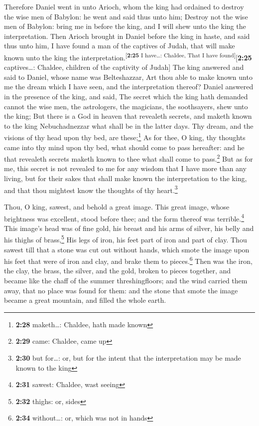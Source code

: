  Therefore Daniel went in unto Arioch, whom the king had
ordained to destroy the wise men of Babylon: he went and said thus unto
him; Destroy not the wise men of Babylon: bring me in before the king,
and I will shew unto the king the interpretation.  Then
Arioch brought in Daniel before the king in haste, and said thus unto
him, I have found a man of the captives of Judah, that will make known
unto the king the interpretation.\textsuperscript{{[}\textbf{2:25} I
have\ldots: Chaldee, That I have found{]}}{[}\textbf{2:25}
captives\ldots: Chaldee, children of the captivity of Judah{]}
 The king answered and said to Daniel, whose name was
Belteshazzar, Art thou able to make known unto me the dream which I have
seen, and the interpretation thereof?  Daniel answered in
the presence of the king, and said, The secret which the king hath
demanded cannot the wise men, the astrologers, the magicians, the
soothsayers, shew unto the king;  But there is a God in
heaven that revealeth secrets, and maketh known to the king
Nebuchadnezzar what shall be in the latter days. Thy dream, and the
visions of thy head upon thy bed, are these;\footnote{\textbf{2:28}
  maketh\ldots: Chaldee, hath made known}  As for thee, O
king, thy thoughts came into thy mind upon thy bed, what should come to
pass hereafter: and he that revealeth secrets maketh known to thee what
shall come to pass.\footnote{\textbf{2:29} came: Chaldee, came up}
 But as for me, this secret is not revealed to me for any
wisdom that I have more than any living, but for their sakes that shall
make known the interpretation to the king, and that thou mightest know
the thoughts of thy heart.\footnote{\textbf{2:30} but for\ldots: or, but
  for the intent that the interpretation may be made known to the king}

 Thou, O king, sawest, and behold a great image. This
great image, whose brightness was excellent, stood before thee; and the
form thereof was terrible.\footnote{\textbf{2:31} sawest: Chaldee, wast
  seeing}  This image's head was of fine gold, his breast
and his arms of silver, his belly and his thighs of brass,\footnote{\textbf{2:32}
  thighs: or, sides}  His legs of iron, his feet part of
iron and part of clay.  Thou sawest till that a stone was
cut out without hands, which smote the image upon his feet that were of
iron and clay, and brake them to pieces.\footnote{\textbf{2:34}
  without\ldots: or, which was not in hands}  Then was
the iron, the clay, the brass, the silver, and the gold, broken to
pieces together, and became like the chaff of the summer
threshingfloors; and the wind carried them away, that no place was found
for them: and the stone that smote the image became a great mountain,
and filled the whole earth.

